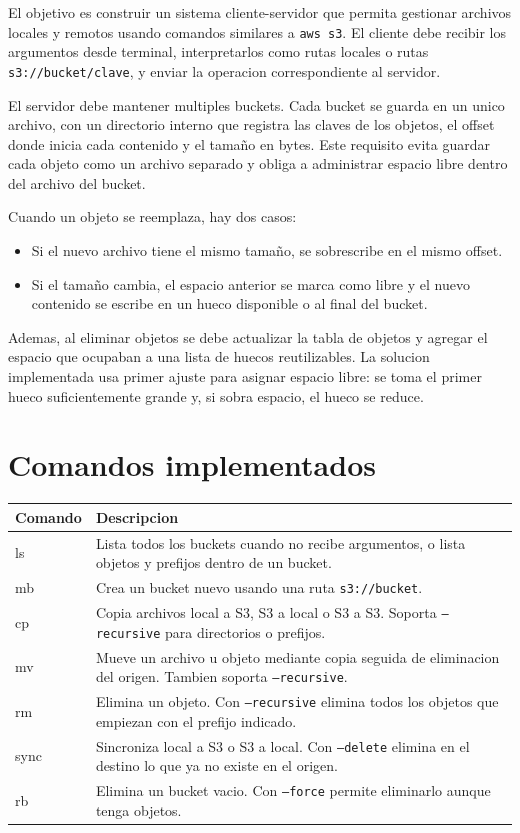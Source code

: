 \documentclass[12pt,letterpaper]{article}
\begin{document}
El objetivo es construir un sistema cliente-servidor que permita gestionar archivos
locales y remotos usando comandos similares a \texttt{aws s3}. El cliente debe
recibir los argumentos desde terminal, interpretarlos como rutas locales o rutas
\texttt{s3://bucket/clave}, y enviar la operacion correspondiente al servidor.

El servidor debe mantener multiples buckets. Cada bucket se guarda en un unico
archivo, con un directorio interno que registra las claves de los objetos, el offset
donde inicia cada contenido y el tama\~{n}o en bytes. Este requisito evita guardar cada
objeto como un archivo separado y obliga a administrar espacio libre dentro del
archivo del bucket.

Cuando un objeto se reemplaza, hay dos casos:
\begin{itemize}
    \item Si el nuevo archivo tiene el mismo tama\~{n}o, se sobrescribe en el mismo offset.
    \item Si el tama\~{n}o cambia, el espacio anterior se marca como libre y el nuevo
    contenido se escribe en un hueco disponible o al final del bucket.
\end{itemize}

Ademas, al eliminar objetos se debe actualizar la tabla de objetos y agregar el
espacio que ocupaban a una lista de huecos reutilizables. La solucion implementada
usa primer ajuste para asignar espacio libre: se toma el primer hueco suficientemente
grande y, si sobra espacio, el hueco se reduce.

\section{Comandos implementados}

\begin{longtable}{>{\ttfamily}p{2.2cm}p{10.7cm}}
\toprule
\textnormal{\textbf{Comando}} & \textbf{Descripcion} \\
\midrule
\endhead
ls & Lista todos los buckets cuando no recibe argumentos, o lista objetos y prefijos dentro de un bucket. \\
mb & Crea un bucket nuevo usando una ruta \texttt{s3://bucket}. \\
cp & Copia archivos local a S3, S3 a local o S3 a S3. Soporta \texttt{--recursive} para directorios o prefijos. \\
mv & Mueve un archivo u objeto mediante copia seguida de eliminacion del origen. Tambien soporta \texttt{--recursive}. \\
rm & Elimina un objeto. Con \texttt{--recursive} elimina todos los objetos que empiezan con el prefijo indicado. \\
sync & Sincroniza local a S3 o S3 a local. Con \texttt{--delete} elimina en el destino lo que ya no existe en el origen. \\
rb & Elimina un bucket vacio. Con \texttt{--force} permite eliminarlo aunque tenga objetos. \\
\bottomrule
\end{longtable}
\end{document}
